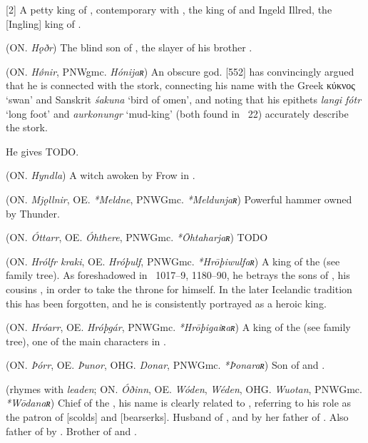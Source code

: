 \begin{itemize}
[2]
  A petty king of , contemporary with , the king of  and Ingeld Illred, the [Ingling] king of .

 (ON. \emph{Hǫðr})
  The blind son of , the slayer of his brother .

 (ON. \emph{Hǿnir}, PNWgmc. \emph{Hónijaʀ})
  An obscure god. \textcite{Rydberg1886}[552] has convincingly argued that he is connected with the stork, connecting his name with the Greek κύκνος ‘swan’ and Sanskrit \emph{śakuna} ‘bird of omen’, and noting that his epithets \emph{langi fótr} ‘long foot’ and \emph{aurkonungr} ‘mud-king’ (both found in \Skaldskaparmal\ 22) accurately describe the stork.

  He gives  TODO.

 (ON. \emph{Hyndla}) A witch awoken by Frow in \Hyndluljod.

 (ON. \emph{Mjǫllnir}, OE. \emph{*Meldne}, PNWGmc. \emph{*Meldunjaʀ})
  Powerful hammer owned by Thunder.

 (ON. \emph{Óttarr}, OE. \emph{Óhthere}, PNWGmc. \emph{*Ōhtaharjaʀ})
  TODO

 (ON. \emph{Hrólfr kraki}, OE. \emph{Hróþulf}, PNWGmc. \emph{*Hrōþiwulfaʀ})
  A king of the  (see family tree). As foreshadowed in \Beowulf\ 1017–9, 1180–90, he betrays the sons of , his cousins , in order to take the throne for himself. In the later Icelandic tradition this has been forgotten, and he is consistently portrayed as a heroic king.

 (ON. \emph{Hróarr}, OE. \emph{Hróþgár}, PNWGmc. \emph{*Hrōþigaiʀaʀ})
  A king of the  (see family tree), one of the main characters in \Beowulf.

 (ON. \emph{Þórr}, OE. \emph{Þunor}, OHG. \emph{Donar}, PNWGmc. \emph{*Þonaraʀ})
  Son of  and .

 (rhymes with \emph{leaden}; ON. \emph{Óðinn}, OE. \emph{Wóden}, \emph{Wéden}, OHG. \emph{Wuotan}, PNWGmc. \emph{*Wōdanaʀ})
  Chief of the , his name is clearly related to , referring to his role as the patron of [scolds] and [bearserks]. Husband of , and by her father of . Also father of  by . Brother of  and .


\end{itemize}
